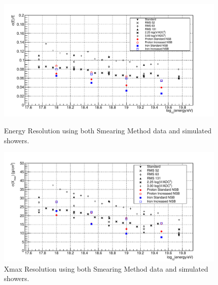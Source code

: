\begin{figure}
\centering
\includegraphics[width=\textwidth]{chapters/graphs/SelectionEff/Combined_EnergyRes_All.pdf}
\caption{Energy Resolution using both Smearing Method data and simulated showers.}
\vspace{3mm}
\includegraphics[width=\textwidth]{chapters/graphs/SelectionEff/Combined_XmaxRes_All.pdf}
\caption{Xmax Resolution using both Smearing Method data and simulated showers.}
\end{figure}
